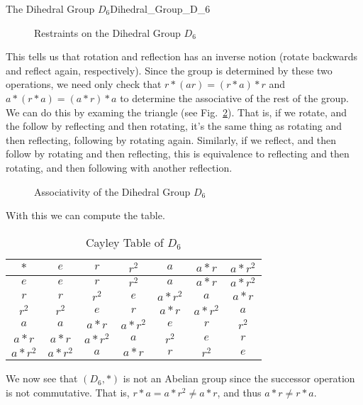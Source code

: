 \begin{lexample}{The Dihedral Group $D_{6}$}{Dihedral_Group_D_6}
\begin{figure}[H]
            \resizebox{\textwidth}{!}{%
                
            }
            \caption{Restraints on the Dihedral Group $D_{6}$}
            \label{fig:Restraints_on_D_6}
        \end{figure}
        This tells us that rotation and reflection has an inverse notion
        (rotate backwards and reflect again, respectively). Since the group is
        determined by these two operations, we need only check that
        $r*(ar)=(r*a)*r$ and $a*(r*a)=(a*r)*a$ to determine the associative of
        the rest of the group. We can do this by examing the triangle
        (see Fig.~\ref{fig:Assoc_of_Dihedral_Group_D6}). That is, if we
        rotate, and the follow by reflecting and then rotating, it's the same
        thing as rotating and then reflecting, following by rotating again.
        Similarly, if we reflect, and then follow by rotating and then
        reflecting, this is equivalence to reflecting and then rotating, and
        then following with another reflection.
        \begin{figure}[H]
            \centering
            \captionsetup{type=figure}
            \resizebox{\textwidth}{!}{%
                
            }
            \caption{Associativity of the Dihedral Group $D_{6}$}
            \label{fig:Assoc_of_Dihedral_Group_D6}
        \end{figure}
        With this we can compute the table.
        \begin{table}[H]
            \centering
            \captionsetup{type=table}
            \begin{tabular}{c|cccccc}
                $*$&$e$&$r$&$r^{2}$&$a$&$a*r$&$a*r^{2}$\\
                \hline
                $e$&$e$&$r$&$r^{2}$&$a$&$a*r$&$a*r^{2}$\\
                $r$&$r$&$r^{2}$&$e$&$a*r^{2}$&$a$&$a*r$\\
                $r^{2}$&$r^{2}$&$e$&$r$&$a*r$&$a*r^{2}$&$a$\\
                $a$&$a$&$a*r$&$a*r^{2}$&$e$&$r$&$r^{2}$\\
                $a*r$&$a*r$&$a*r^{2}$&$a$&$r^{2}$&$e$&$r$\\
                $a*r^{2}$&$a*r^{2}$&$a$&$a*r$&$r$&$r^{2}$&$e$
            \end{tabular}
            \caption{Cayley Table of $D_{6}$}
            \label{tab:Cayley_Table_D_6}
        \end{table}
        We now see that $(D_{6},*)$ is not an Abelian group since the successor
        operation is not commutative. That is, $r*a=a*r^{2}\ne{a}*r$, and thus
        $a*r\ne{r}*a$.
    \end{lexample}
